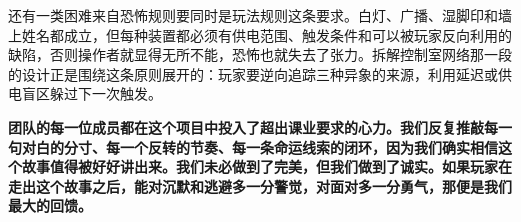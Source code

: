 还有一类困难来自恐怖规则要同时是玩法规则这条要求。白灯、广播、湿脚印和墙上姓名都成立，但每种装置都必须有供电范围、触发条件和可以被玩家反向利用的缺陷，否则操作者就显得无所不能，恐怖也就失去了张力。拆解控制室网络那一段的设计正是围绕这条原则展开的：玩家要逆向追踪三种异象的来源，利用延迟或供电盲区躲过下一次触发。

\textbf{团队的每一位成员都在这个项目中投入了超出课业要求的心力。我们反复推敲每一句对白的分寸、每一个反转的节奏、每一条命运线索的闭环，因为我们确实相信这个故事值得被好好讲出来。我们未必做到了完美，但我们做到了诚实。如果玩家在走出这个故事之后，能对沉默和逃避多一分警觉，对面对多一分勇气，那便是我们最大的回馈。}
